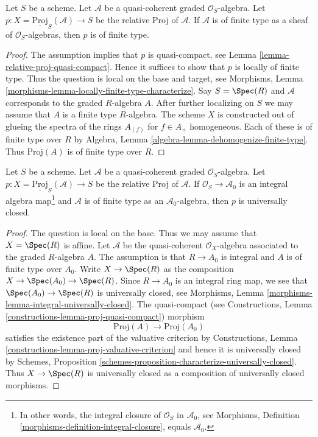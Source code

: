 \begin{lemma}
\label{lemma-relative-proj-finite-type}
Let $S$ be a scheme. Let $\mathcal{A}$ be a quasi-coherent graded
$\mathcal{O}_S$-algebra. Let
$p : X = \underline{\text{Proj}}_S(\mathcal{A}) \to S$ be the relative
Proj of $\mathcal{A}$. If $\mathcal{A}$ is of finite type as a sheaf of
$\mathcal{O}_S$-algebras, then $p$ is of finite type.
\end{lemma}

\begin{proof}
The assumption implies that $p$ is quasi-compact, see
Lemma \ref{lemma-relative-proj-quasi-compact}. Hence it suffices
to show that $p$ is locally of finite type.
Thus the question is local on the base and target, see
Morphisms, Lemma \ref{morphisms-lemma-locally-finite-type-characterize}.
Say $S = \Spec(R)$ and $\mathcal{A}$ corresponds to the
graded $R$-algebra $A$. After further localizing on $S$ we may
assume that $A$ is a finite type $R$-algebra. The scheme $X$ is constructed
out of glueing the spectra of the rings $A_{(f)}$ for $f \in A_{+}$
homogeneous. Each of these is of finite type over $R$ by
Algebra, Lemma \ref{algebra-lemma-dehomogenize-finite-type}.
Thus $\text{Proj}(A)$ is of finite type over $R$.
\end{proof}

\begin{lemma}
\label{lemma-relative-proj-universally-closed}
Let $S$ be a scheme. Let $\mathcal{A}$ be a quasi-coherent graded
$\mathcal{O}_S$-algebra. Let
$p : X = \underline{\text{Proj}}_S(\mathcal{A}) \to S$ be the relative
Proj of $\mathcal{A}$. If $\mathcal{O}_S \to \mathcal{A}_0$
is an integral algebra map\footnote{In other words, the integral
closure of $\mathcal{O}_S$ in $\mathcal{A}_0$, see
Morphisms, Definition \ref{morphisms-definition-integral-closure}, equals
$\mathcal{A}_0$.} and $\mathcal{A}$ is of finite type as an
$\mathcal{A}_0$-algebra, then $p$ is universally closed.
\end{lemma}

\begin{proof}
The question is local on the base. Thus we may assume that $X = \Spec(R)$
is affine. Let $\mathcal{A}$ be the quasi-coherent $\mathcal{O}_X$-algebra
associated to the graded $R$-algebra $A$. The assumption is that $R \to A_0$
is integral and $A$ is of finite type over $A_0$.
Write $X \to \Spec(R)$ as the composition $X \to \Spec(A_0) \to \Spec(R)$.
Since $R \to A_0$ is an integral ring map, we see that
$\Spec(A_0) \to \Spec(R)$ is universally closed, see
Morphisms, Lemma \ref{morphisms-lemma-integral-universally-closed}.
The quasi-compact (see
Constructions, Lemma \ref{constructions-lemma-proj-quasi-compact}) morphism
$$
\text{Proj}(A) \to \text{Proj}(A_0)
$$
satisfies the existence part of the valuative criterion by
Constructions, Lemma \ref{constructions-lemma-proj-valuative-criterion}
and hence it is universally closed by
Schemes, Proposition \ref{schemes-proposition-characterize-universally-closed}.
Thus $X \to \Spec(R)$ is universally closed as a composition of
universally closed morphisms.
\end{proof}

